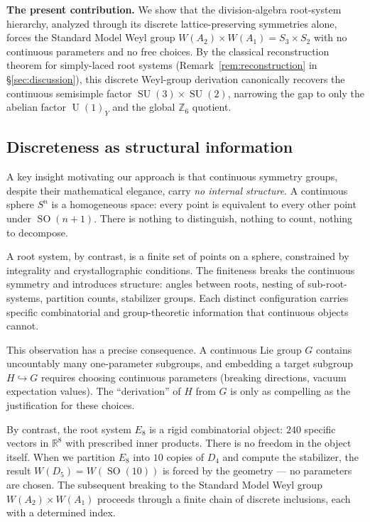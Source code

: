 \documentclass[11pt,reqno]{amsart}
\theoremstyle{plain}
\theoremstyle{definition}
\theoremstyle{remark}
\newcommand{\R}{\mathbb{R}}
\newcommand{\Z}{\mathbb{Z}}
\DeclareMathOperator{\SO}{SO}
\DeclareMathOperator{\SU}{SU}
\DeclareMathOperator{\U}{U}
\begin{document}
\medskip
\noindent\textbf{The present contribution.}\quad
We show that the division-algebra root-system hierarchy,
analyzed through its discrete lattice-preserving symmetries
alone, forces the Standard Model Weyl group
$W(A_2)\times W(A_1) = S_3 \times S_2$
with no continuous parameters and no free choices.
By the classical reconstruction theorem for simply-laced root
systems (Remark~\ref{rem:reconstruction} in
\S\ref{sec:discussion}),
this discrete Weyl-group derivation canonically recovers the
continuous semisimple factor $\SU(3)\times\SU(2)$, narrowing
the gap to only the abelian factor $\U(1)_Y$ and the global
$\Z_6$ quotient.

\subsection{Discreteness as structural information}
\label{sec:discreteness}

A key insight motivating our approach is that continuous
symmetry groups, despite their mathematical elegance,
carry \emph{no internal structure}.
A continuous sphere $S^n$ is a homogeneous space:
every point is equivalent to every other point under $\SO(n+1)$.
There is nothing to distinguish, nothing to count, nothing
to decompose.

A root system, by contrast, is a finite set of points on a
sphere, constrained by integrality and crystallographic
conditions.
The finiteness breaks the continuous symmetry and introduces
structure: angles between roots, nesting of sub-root-systems,
partition counts, stabilizer groups.
Each distinct configuration carries specific combinatorial and
group-theoretic information that continuous objects cannot.

This observation has a precise consequence.
A continuous Lie group $G$ contains uncountably many
one-parameter subgroups, and embedding a target subgroup
$H \hookrightarrow G$ requires choosing continuous parameters
(breaking directions, vacuum expectation values).
The ``derivation'' of $H$ from $G$ is only as compelling as
the justification for these choices.

By contrast, the root system $E_8$ is a rigid combinatorial
object: $240$ specific vectors in $\R^8$ with prescribed inner
products.
There is no freedom in the object itself.
When we partition $E_8$ into $10$ copies of $D_4$ and compute
the stabilizer, the result $W(D_5) = W(\SO(10))$ is forced
by the geometry --- no parameters are chosen.
The subsequent breaking to the Standard Model Weyl group
$W(A_2) \times W(A_1)$ proceeds through a finite chain of
discrete inclusions, each with a determined index.
\end{document}
